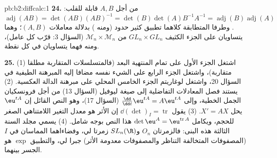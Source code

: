 \begin{solution}{pb:b2:diffcalc:1}
\textbf{24.} من أجل $A, B$ قابلة للقلب: $\operatorname{adj}(AB) =
\det(AB)(AB)^{-1} = \det(B)\det(A)B^{-1}A^{-1} =
\operatorname{adj}(B)\operatorname{adj}(A)$. وطرفا المتطابقة
كلاهما تطبيق كثير حدود (ومنه ) بدلالة معاملات $(A, B)$؛ وهما
يتساويان على الجزء الكثيف $GL_n\times GL_n$ من $\mathcal M_n\times\mathcal M_n$ (السؤال 3: قرّب كل عامل)،
ومنه فهما يتساويان في كل نقطة.

\textbf{25.} (1) اشتغل الجزء الأول على تمام 
المنتهية البعد (فالمتسلسلات المتقاربة مطلقا متقاربة)، واشتغل الجزء
الرابع على الشيء نفسه مضافا إليه المبرهنة الطيفية في السؤال 20،
واشتغل لوغاريتم الجزء الخامس المحلي على مبرهنة الدالة العكسية. (2)
يستند فصل المعادلات التفاضلية إلى صيغة ليوفيل (السؤال 13) من أجل
فرونسكيان الجمل الخطية، وإلى $\frac{\dd}{\dd t}\eu^{tA} = A\eu^{tA}$ (السؤال 17)، وهو النص القائل
إن $\eu^{tA}$ يحل $X' = AX$. (3) يقول $\dd(\det)_I = \operatorname{tr}$ إن الأثر هو معدل التغير
اللامتناهي الصغر للحجم، ويكامل $\det\eu^A =
\eu^{\operatorname{tr}A}$ هذا النص بوجه شامل.
(4) يسمي مجلد السنة الثالثة هذه البنى: فالزمرتان $O_n$ و$SL_n(\R)$
زمرتا لي، وفضاءاهما المماسان في $I$ (المصفوفات المتخالفة التناظر
والمصفوفات معدومة الأثر) جبرا لي، والتطبيق $\exp$ هو الجسر بينهما.
\end{solution}
